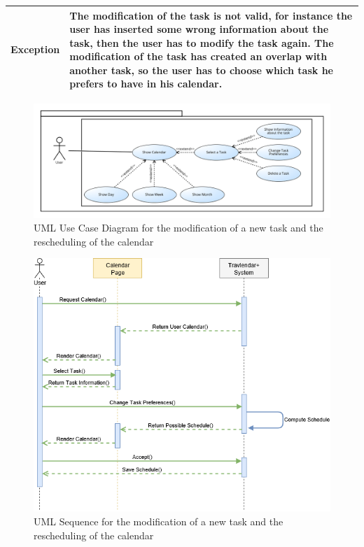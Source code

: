 \begin{table}[H]
\begin{tabular}{|p{3.5cm}|p{10.3cm}|}
    \hline
    \textbf{\large{Exception}} 			& The modification of the task is not valid, for instance the user has inserted some wrong information about the task, then the user has to modify the task again. \newline
    The modification of the task has created an overlap with another task, so the user has to choose which task he prefers to have in his calendar.\\
    
    \hline
    
    
    \end{tabular}
	
\end{table}

\begin{figure}[H]
\centering
\includegraphics[scale=0.5]{Pictures/UseCaseDiagram/Rescheduling.png}
\caption{UML Use Case Diagram for the modification of a new task and the rescheduling of the calendar}
\end{figure}

\begin{figure}[H]
\centering
\includegraphics[scale=0.5]{Pictures/SequenceDiagram/rescheduling.png}
\caption{UML Sequence for the modification of a new task and the rescheduling of the calendar}
\end{figure}